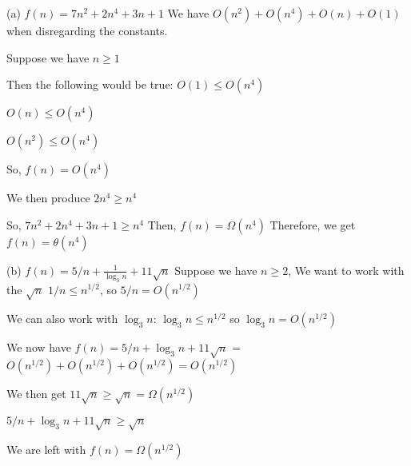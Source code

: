 \documentclass{article}
\begin{document}
\begin{solution}
\begin{description}
\item{(a)} $f(n) = 7n^2 + 2n^4 + 3n + 1$
\newline
We have $O(n^2) + O(n^4) + O(n) + O(1)$ when disregarding the constants.

\newline

Suppose we have $n \ge 1$

\newline

Then the following would be true:
\newline
\newline
$O(1) \le O(n^4)$

$O(n) \le O(n^4)$

$O(n^2) \le O(n^4)$

So, $f(n) = O(n^4)$
\newline

We then produce $2n^4 \ge n^4$

So, $7n^2 + 2n^4 + 3n + 1 \ge n^4$
\newline
Then, $f(n) = \Omega(n^4)$
\newline
Therefore, we get $f(n) = \theta(n^4)$
\newline

\item{(b)} $f(n) = 5/n + \frac{1}{\log_3 n} + 11\sqrt{n}$
\newline
Suppose we have $n \ge 2$,
\newline
We want to work with the $\sqrt{n}$
\newline
$1/n \le n^{1/2}$, so $5/n = O(n^{1/2})$
\newline

We can also work with $\log_3 n$:
\newline
$\log_3 n \le n^{1/2}$ so $\log_3 n = O(n^{1/2})$
\newline

We now have $f(n) = 5/n + \log_3 n + 11\sqrt{n}$ = $O(n^{1/2}) + O(n^{1/2}) + O(n^{1/2}) = O(n^{1/2})$
\newline

We then get $11\sqrt{n} \ge \sqrt{n} = \Omega(n^{1/2})$
\newline

$5/n + \log_3 n + 11\sqrt{n} \ge \sqrt{n}$
\newline

We are left with $f(n) = \Omega(n^{1/2})$
\newline


\end{description}
\end{solution}
\end{document}
